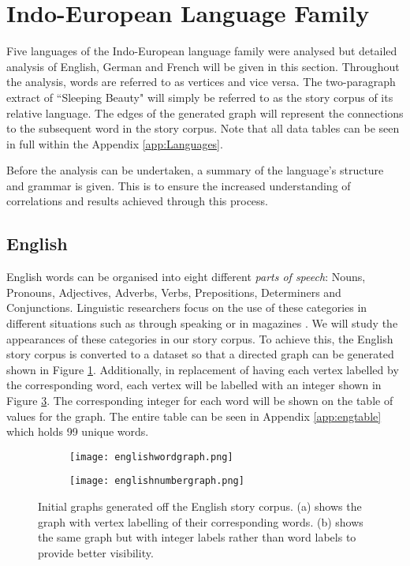 \section{Indo-European Language Family}
Five languages of the Indo-European language family were analysed but detailed analysis of English, German and French will be given in this section. Throughout the analysis, words are referred to as vertices and vice versa. The two-paragraph extract of ``Sleeping Beauty" will simply be referred to as the story corpus of its relative language. The edges of the generated graph will represent the connections to the subsequent word in the story corpus. Note that all data tables can be seen in full within the Appendix \ref{app:Languages}.

Before the analysis can be undertaken, a summary of the language's structure and grammar is given. This is to ensure the increased understanding of correlations and results achieved through this process.

\subsection{English}
English words can be organised into eight different \emph{parts of speech}: Nouns, Pronouns, Adjectives, Adverbs, Verbs, Prepositions, Determiners and Conjunctions. Linguistic researchers focus on the use of these categories in different situations such as through speaking or in magazines \cite{khaisaeng2017study}. We will study the appearances of these categories in our story corpus. To achieve this, the English story corpus is converted to a dataset so that a directed graph can be generated shown in Figure \ref{fig:engword}. Additionally, in replacement of having each vertex labelled by the corresponding word, each vertex will be labelled with an integer shown in Figure \ref{fig:engnum}. The corresponding integer for each word will be shown on the table of values for the graph. The entire table can be seen in Appendix \ref{app:engtable} which holds 99 unique words.

\begin{figure}[!htb]
\centering
\begin{subfigure}{.45\textwidth}
	\texttt{[image: englishwordgraph.png]}
	\caption{}
	\label{fig:engword}
\end{subfigure}
\hfill
\begin{subfigure}{.45\textwidth}
	\texttt{[image: englishnumbergraph.png]}
	\caption{}
	\label{fig:engnum}
\end{subfigure}
\caption{Initial graphs generated off the English story corpus. (a) shows the graph with vertex labelling of their corresponding words. (b) shows the same graph but with integer labels rather than word labels to provide better visibility.}
\end{figure}

